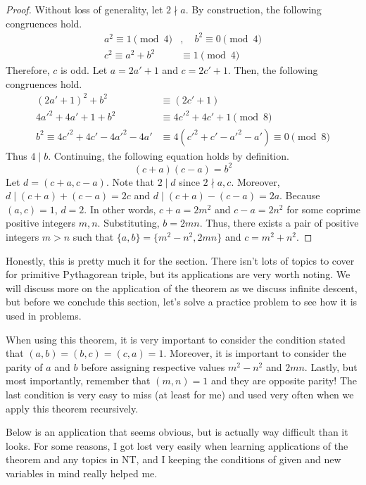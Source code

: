 \documentclass[../../../main.tex]{subfiles}
\begin{document}
\begin{proof}
Without loss of generality, let $2 \nmid a$. By construction,
the following congruences hold.
\begin{align*}
    a^2 \equiv 1 \pmod{4}&, \quad b^2 \equiv 0 \pmod{4} \\
    c^2 \equiv a^2 + b^2 &\equiv 1 \pmod{4}
\end{align*}
Therefore, $c$ is odd. Let $a = 2a' + 1$ and $c = 2c' + 1$.
Then, the following congruences hold.
\begin{align*}
    (2a' + 1)^2 + b^2 &\equiv (2c' + 1) \\
    4a'^2 + 4a' + 1 + b^2 &\equiv 4c'^2 + 4c' + 1 \pmod{8} \\
    b^2 \equiv 4c'^2 + 4c' - 4a'^2 - 4a'
    &\equiv 4 (c'^2 + c' - a'^2 - a') \equiv 0 \pmod{8}
\end{align*}
Thus $4 \mid b$. Continuing, the following equation holds by
definition.
\[
(c + a)(c - a) = b^2
\]
Let $d = (c + a, c - a)$. Note that $2 \mid d$ since $2 \nmid a, c$.
Moreover, $d \mid (c + a) + (c - a) = 2c$ and $d \mid (c + a) -
(c - a) = 2a$. Because $(a, c) = 1$, $d = 2$. In other words,
$c + a = 2m^2$ and $c - a = 2n^2$ for some coprime positive
integers $m, n$. Substituting, $b = 2mn$. Thus, there exists
a pair of positive integers $m > n$ such that $\{ a, b \} =
\{ m^2 - n^2, 2mn \}$ and $c = m^2 + n^2$.
\end{proof}

Honestly, this is pretty much it for the section. There isn't
lots of topics to cover for primitive Pythagorean triple, but
its applications are very worth noting. We will discuss more
on the application of the theorem as we discuss infinite
descent, but before we conclude this section, let's solve
a practice problem to see how it is used in problems.

\begin{important}
When using this theorem, it is very important to consider the
condition stated that $(a, b) = (b, c) = (c, a) = 1$. Moreover,
it is important to consider the parity of $a$ and $b$ before
assigning respective values $m^2 - n^2$ and $2mn$. Lastly, but
most importantly, remember that $(m, n) = 1$ and they are opposite
parity! The last condition is very easy to miss (at least for me)
and used very often when we apply this theorem recursively.
\end{important}

Below is an application that seems obvious, but is actually
way difficult than it looks. For some reasons, I got lost very
easily when learning applications of the theorem and any topics
in NT, and I keeping the conditions of given and new variables
in mind really helped me.
\end{document}

